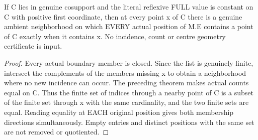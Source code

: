 \begin{theorem}
\label{hir:sharp-actual-full-refl-born-incidence-rigidity}
\leanok
If C lies in genuine cosupport and the literal reflexive FULL value is
constant on C with positive first coordinate, then at every point x of C there is a genuine
ambient neighborhood on which EVERY actual position of M.E contains a point
of C exactly when it contains x. No incidence, count or centre geometry
certificate is input.
\end{theorem}
\begin{proof}
Every actual boundary member is closed. Since the list is genuinely finite,
intersect the complements of the members missing x to obtain a neighborhood
where no new incidence can occur. The preceding theorem makes actual counts
equal on C. Thus the finite set of indices through a nearby point of C is
a subset of the finite set through x with the same cardinality, and the two
finite sets are equal. Reading equality at EACH original position gives
both membership directions simultaneously. Empty entries and distinct
positions with the same set are not removed or quotiented.
\end{proof}

